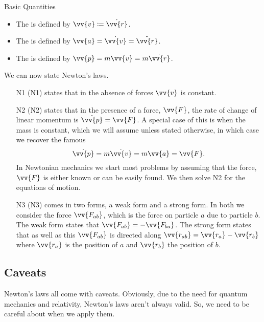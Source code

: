 \documentclass[fleqn]{NotesClass}
\begin{document}
    \begin{dfn}{Basic Quantities}{}
        \begin{itemize}
            \item The  is defined by \(\vv{v} \coloneqq \dot{\vv{r}}\).
            \item The  is defined by \(\vv{a} = \dot{\vv{v}} = \ddot{\vv{r}}\).
            \item The  is defined by \(\vv{p} = m\vv{v} = m\dot{\vv{r}}\).
        \end{itemize}
    \end{dfn}
    
    We can now state Newton's laws.
    \begin{itemize}
        \item[N1]  (N1) states that in the absence of forces \(\vv{v}\) is constant.
        \item[N2]  (N2) states that in the presence of a force, \(\vv{F}\), the rate of change of linear momentum is \(\dot{\vv{p}} = \vv{F}\).
        A special case of this is when the mass is constant, which we will assume unless stated otherwise, in which case we recover the famous
        \begin{equation}
            \dot{\vv{p}} = m\dot{\vv{v}} = m\vv{a} = \vv{F}.
        \end{equation}
        In Newtonian mechanics we start most problems by assuming that the force, \(\vv{F}\) is either known or can be easily found.
        We then solve N2 for the equations of motion.
        \item[N3]  (N3) comes in two forms, a weak form and a strong form.
        In both we consider the force \(\vv{F_{ab}}\), which is the force on particle \(a\) due to particle \(b\).
        The weak form states that \(\vv{F_{ab}} = -\vv{F_{ba}}\).
        The strong form states that as well as this \(\vv{F_{ab}}\) is directed along \(\vv{r_{ab}} = \vv{r_a} - \vv{r_b}\) where \(\vv{r_a}\) is the position of \(a\) and \(\vv{r_b}\) the position of \(b\).
    \end{itemize}

    \subsection{Caveats}
    Newton's laws all come with caveats.
    Obviously, due to the need for quantum mechanics and relativity, Newton's laws aren't always valid.
    So, we need to be careful about when we apply them.
    
\end{document}
